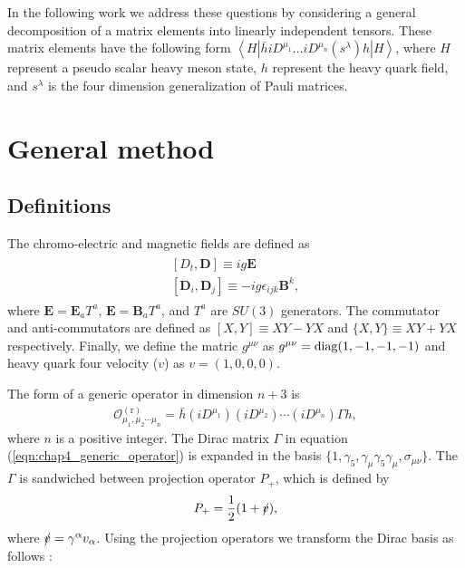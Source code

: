 In the following work we address these questions by considering a general decomposition of a matrix elements into linearly independent tensors. These matrix elements have the following form $\left\langle H\left|\bar{h} i D^{\mu_{1}} \ldots i D^{\mu_{n}}\left(s^{\lambda}\right) h\right| H\right\rangle$, where $H$ represent a pseudo scalar heavy meson state, $h$ represent the heavy quark field, and $s^{\lambda}$ is the four dimension generalization of Pauli matrices.
\section{General method}\label{sec:gen_method}
\subsection{Definitions}\label{sec:def}
The chromo-electric and magnetic fields are defined as
\begin{eqnarray}\label{eqn:Chap4_chromo_elec_mag}
\begin{array}{l}
{\left[D_{t}, \mathbf{D}\right] \equiv i g \mathbf{E}} \\
{\left[\bm{D}_{i}, \bm{D}_{j}\right] \equiv-i g \epsilon_{i j k} \bm{B}^{k}},
\end{array}
\end{eqnarray}
where $\bm{E}=\bm{E}_aT^a$, $\bm{E}=\bm{B}_aT^a$, and $T^a$ are $SU(3)$ generators. The commutator and anti-commutators are defined as $[X, Y] \equiv X Y-Y X$ and $\{X, Y\} \equiv X Y+Y X$ respectively. Finally, we define the matric $g^{\mu\nu}$ as $g^{\mu\nu}=\rm{diag}(1,-1,-1,-1)$ and heavy quark four velocity ($v$) as $v=(1,0,0,0)$.\par
The form of a generic operator in dimension $n+3$ is \cite{Mannel:1994kv}
\begin{eqnarray}\label{eqn:chap4_generic_operator}
\mathcal{O}_{\mu_{1}, \mu_{2} \cdots \mu_{n}}^{(\mathrm{r})}=\bar{h}\left(i D^{\mu_{1}}\right)\left(i D^{\mu_{2}}\right) \cdots\left(i D^{\mu_{n}}\right) \Gamma h,
\end{eqnarray}
where $n$ is a positive integer. The Dirac matrix $\Gamma$ in equation (\ref{eqn:chap4_generic_operator}) is expanded in the basis $\lbrace 1, \gamma_{5}, \gamma_{\mu} \gamma_{5} \gamma_{\mu}, \sigma_{\mu \nu}\rbrace$. The $\Gamma$ is sandwiched between projection operator $P_{+}$, which is defined by
\begin{eqnarray}\label{eqn:chap4_proj}
P_{+}=\frac{1}{2}(1+\slashed{v}),
\end{eqnarray}
where $\slashed{v}=\gamma^{\alpha}v_{\alpha}$. Using the projection operators we transform the Dirac basis as follows \cite{Mannel:1994kv}:
